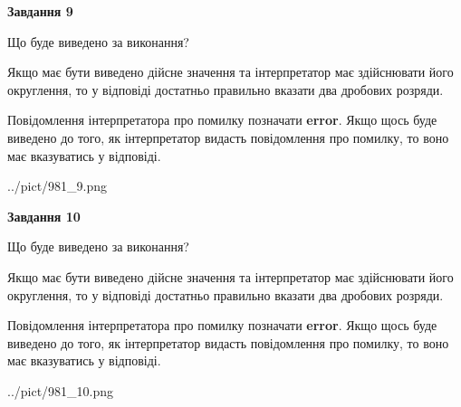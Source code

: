 \documentclass[12pt, ukrainian]{article}
\begin{document}
{\begin {Large}
{\begin {center}\textbf{Завдання 9}\end {center}}\par
Що буде виведено за виконання? \par

Якщо має бути виведено дійсне значення та інтерпретатор має здійснювати його округлення, 
то у відповіді достатньо правильно вказати два дробових розряди.

Повідомлення інтерпретатора про помилку позначати \textbf{error}.
Якщо щось буде виведено до того, як інтерпретатор видасть повідомлення про помилку, 
то воно має вказуватись у відповіді. \par

\begin{center}
	{../pict/981_9.png}
\end{center}
\newpage

{\begin {center}\textbf{Завдання 10}\end {center}}\par
Що буде виведено за виконання? \par

Якщо має бути виведено дійсне значення та інтерпретатор має здійснювати його округлення, 
то у відповіді достатньо правильно вказати два дробових розряди.

Повідомлення інтерпретатора про помилку позначати \textbf{error}.
Якщо щось буде виведено до того, як інтерпретатор видасть повідомлення про помилку, 
то воно має вказуватись у відповіді. \par

\begin{center}
	{../pict/981_10.png}
\end{center}
\newpage

\end {Large}}
\end{document}
